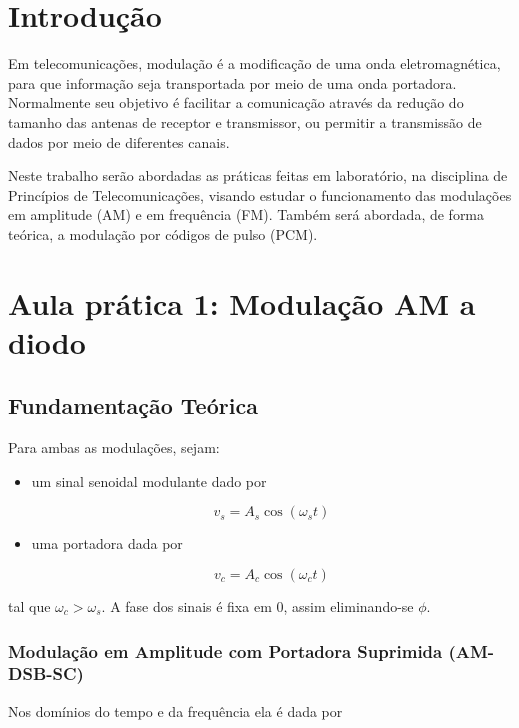 \documentclass[]{report}
\title{}
\begin{document}

\tableofcontents

\chapter{Introdução}

Em telecomunicações, modulação é a modificação de uma onda eletromagnética, para que informação seja transportada por meio de uma onda portadora. Normalmente seu objetivo é facilitar a comunicação através da redução do tamanho das antenas de receptor e transmissor, ou permitir a transmissão de dados por meio de diferentes canais.

Neste trabalho serão abordadas as práticas feitas em laboratório, na disciplina de Princípios de Telecomunicações, visando estudar o funcionamento das modulações em amplitude (AM) e em frequência (FM). Também será abordada, de forma teórica, a modulação por códigos de pulso (PCM). 

\chapter{Aula prática 1: Modulação AM a diodo}
\section{Fundamentação Teórica}
Para ambas as modulações, sejam:

\begin{itemize}
\item um sinal senoidal modulante dado por 

\begin{equation}\label{eq_modulante}
v_s = A_s \cos(\omega_s t)
\end{equation}

\item uma portadora dada por

\begin{equation}\label{eq_portadora}
v_c = A_c \cos(\omega_c t)
\end{equation}
\end{itemize}
tal que $\omega_c > \omega_s$. A fase dos sinais é fixa em $0$, assim eliminando-se $\phi$. 

\subsection{Modulação em Amplitude com Portadora Suprimida (AM-DSB-SC)}
Nos domínios do tempo e da frequência ela é dada por
\end{document}
